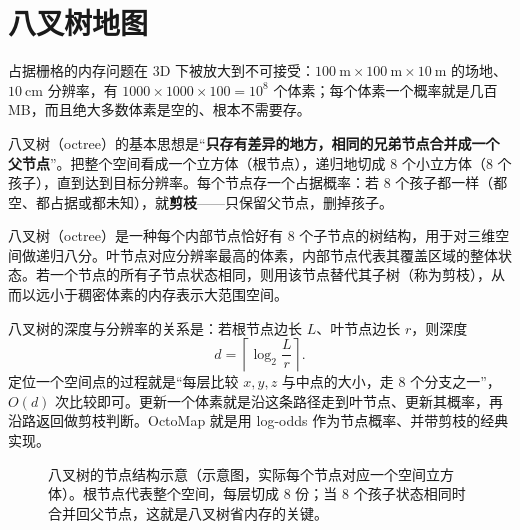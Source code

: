 \section{八叉树地图}\label{sec:14-octree}

占据栅格的内存问题在 3D 下被放大到不可接受：$100\ \mathrm{m}\times100\ \mathrm{m}\times10\ \mathrm{m}$ 的场地、$10\ \mathrm{cm}$ 分辨率，有 $1000\times1000\times100=10^{8}$ 个体素；每个体素一个概率就是几百 MB，而且绝大多数体素是空的、根本不需要存。

八叉树（octree）的基本思想是``\textbf{只存有差异的地方，相同的兄弟节点合并成一个父节点}''。把整个空间看成一个立方体（根节点），递归地切成 8 个小立方体（8 个孩子），直到达到目标分辨率。每个节点存一个占据概率：若 8 个孩子都一样（都空、都占据或都未知），就\textbf{剪枝}——只保留父节点，删掉孩子。

\begin{definition}[八叉树]
八叉树（octree）是一种每个内部节点恰好有 8 个子节点的树结构，用于对三维空间做递归八分。叶节点对应分辨率最高的体素，内部节点代表其覆盖区域的整体状态。若一个节点的所有子节点状态相同，则用该节点替代其子树（称为剪枝），从而以远小于稠密体素的内存表示大范围空间。
\end{definition}

八叉树的深度与分辨率的关系是：若根节点边长 $L$、叶节点边长 $r$，则深度
\begin{equation}
d=\left\lceil\log_2\frac{L}{r}\right\rceil .
\end{equation}
定位一个空间点的过程就是``每层比较 $x,y,z$ 与中点的大小，走 8 个分支之一''，$O(d)$ 次比较即可。更新一个体素就是沿这条路径走到叶节点、更新其概率，再沿路返回做剪枝判断。OctoMap\cite{hornung2013octomap} 就是用 log-odds 作为节点概率、并带剪枝的经典实现。

\begin{figure}[htbp]
  \centering
  \caption{八叉树的节点结构示意（示意图，实际每个节点对应一个空间立方体）。根节点代表整个空间，每层切成 8 份；当 8 个孩子状态相同时合并回父节点，这就是八叉树省内存的关键。}\label{fig:14-octree}
\end{figure}

